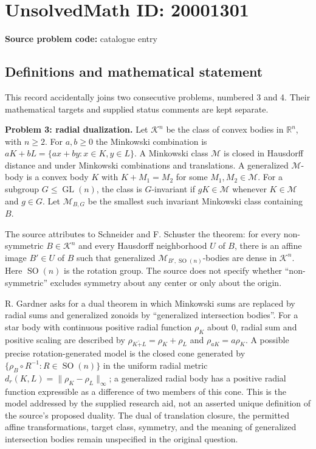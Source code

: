 \documentclass[11pt]{article}
\newcommand{\R}{\mathbb{R}}
\begin{document}
\section*{UnsolvedMath ID: 20001301}
\textbf{Source problem code:} catalogue entry
\subsection{Definitions and mathematical statement}
This record accidentally joins two consecutive problems, numbered 3 and 4. Their mathematical targets and supplied status comments are kept separate.

\textbf{Problem 3: radial dualization.} Let $\mathcal K^n$ be the class of convex bodies in $\R^n$, with $n\geq2$. For $a,b\geq0$ the Minkowski combination is $aK+bL=\{ax+by:x\in K,y\in L\}$. A Minkowski class $\mathcal M$ is closed in Hausdorff distance and under Minkowski combinations and translations. A generalized $\mathcal M$-body is a convex body $K$ with $K+M_1=M_2$ for some $M_1,M_2\in\mathcal M$. For a subgroup $G\leq\operatorname{GL}(n)$, the class is $G$-invariant if $gK\in\mathcal M$ whenever $K\in\mathcal M$ and $g\in G$. Let $\mathcal M_{B,G}$ be the smallest such invariant Minkowski class containing $B$.

The source attributes to Schneider and F. Schuster the theorem: for every non-symmetric $B\in\mathcal K^n$ and every Hausdorff neighborhood $U$ of $B$, there is an affine image $B'\in U$ of $B$ such that generalized $\mathcal M_{B',\operatorname{SO}(n)}$-bodies are dense in $\mathcal K^n$. Here $\operatorname{SO}(n)$ is the rotation group. The source does not specify whether ``non-symmetric'' excludes symmetry about any center or only about the origin.

R. Gardner asks for a dual theorem in which Minkowski sums are replaced by radial sums and generalized zonoids by ``generalized intersection bodies''. For a star body with continuous positive radial function $\rho_K$ about $0$, radial sum and positive scaling are described by $\rho_{K\widetilde+L}=\rho_K+\rho_L$ and $\rho_{aK}=a\rho_K$. A possible precise rotation-generated model is the closed cone generated by $\{\rho_B\circ R^{-1}:R\in\operatorname{SO}(n)\}$ in the uniform radial metric $d_r(K,L)=\|\rho_K-\rho_L\|_\infty$; a generalized radial body has a positive radial function expressible as a difference of two members of this cone. This is the model addressed by the supplied research aid, not an asserted unique definition of the source's proposed duality. The dual of translation closure, the permitted affine transformations, target class, symmetry, and the meaning of generalized intersection bodies remain unspecified in the original question.
\end{document}
